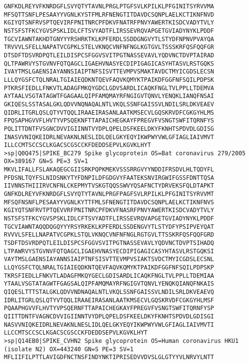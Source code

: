 \begin{lstlisting}
GNFKDLREYVFKNRDGFLSVYQTYTAVNLPRGLPTGFSVLKPILKLPFGINITSYRVVMA
MFSQTTSNFLPESAAYYVGNLKYSTFMLRFNENGTITDAVDCSQNPLAELKCTIKNFNVD
KGIYQTSNFRVSPTQEVIRFPNITNRCPFDKVFNATRFPNVYAWERTKISDCVADYTVLY
NSTSFSTFKCYGVSPSKLIDLCFTSVYADTFLIRSSEVRQVAPGETGVIADYNYKLPDDF
TGCVIAWNTAKHDTGNYYYRSHRKTKLKPFERDLSSDDGNGVYTLSTYDFNPNVPVAYQA
TRVVVLSFELLNAPATVCGPKLSTELVKNQCVNFNFNGLKGTGVLTSSSKRFQSFQQFGR
DTSDFTDSVRDPQTLEILDISPCSFGGVSVITPGTNASSEVAVLYQDVNCTDVPTAIRAD
QLTPAWRVYSTGVNVFQTQAGCLIGAEHVNASYECDIPIGAGICASYHTASVLRSTGQKS
IVAYTMSLGAENSIAYANNSIAIPTNFSISVTTEVMPVSMAKTAVDCTMYICGDSLECSN
LLLQYGSFCTQLNRALTGIAIEQDKNTQEVFAQVKQMYKTPAIKDFGGFNFSQILPDPSK
PTKRSFIEDLLFNKVTLADAGFMKQYGDCLGDVSARDLICAQKFNGLTVLPPLLTDEMVA
AYTAALVSGTATAGWTFGAGAALQIPFAMQMAYRFNGIGVTQNVLYENQKLIANQFNSAI
GKIQESLSSTASALGKLQDVVNQNAQALNTLVKQLSSNFGAISSVLNDILSRLDKVEAEV
QIDRLITGRLQSLQTYVTQQLIRAAEIRASANLAATKMSECVLGQSKRVDFCGKGYHLMS
FPQSAPHGVVFLHVTYVPSQEKNFTTAPAICHEGKAYFPREGVFVSNGTSWFITQRNFYS
PQLITTDNTFVSGNCDVVIGIINNTVYDPLQPELDSFKEELDKYFKNHTSPDVDLGDISG
INASVVNIQKEIDRLNEVAKNLNESLIDLQELGKYEQYIKWPWYVWLGFIAGLIAIVMVT
ILLCCMTSCCSCLKGACSCGSCCKFDEDDSEPVLKGVKLHYT
>sp|Q0Q475|SPIKE_BC279 Spike glycoprotein OS=Bat coronavirus 279/2005 OX=389167 GN=S PE=3 SV=1
MKVLIFALLFSLAKAQEGCGIISRKPQPKMEKVSSSRRGVYYNDDIFRSDVLHLTQDYFL
PFDSNLTQYFSLNIDSNKYTYFDNPILDFGDGVYFAATEKSNVIRGWIFGSSFDNTTQSA
IIVNNSTHIIIRVCNFNLCKEPMYTVSKGTQQSSWVYQSAFNCTYDRVEKSFQLDTAPKT
GNFKDLREYVFKNRDGFLSVYQTYTAVNLPRGFPAGFSVLRPILKLPFGINITSYRVVMT
MFSQFNSNFLPESAAYYVGNLKYTTFMLSFNENGTITDAVDCSQNPLAELKCTIKNFNVS
KGIYQTSNFRVTPTQEVVRFPNITNRCPFDKVFNASRFPNVYAWERTKISDCVADYTVLY
NSTSFSTFKCYGVSPSKLIDLCFTSVYADTFLIRSSEVRQVAPGETGVIADYNYKLPDDF
TGCVIAWNTAQQDQGQYYYRSYRKEKLKPFERDLSSDENGVYTLSTYDFYPSIPVEYQAT
RVVVLSFELLNAPATVCGPKLSTQLVKNQCVNFNFNGLRGTGVLTTSSKRFQSFQQFGRD
TSDFTDSVRDPQTLEILDISPCSFGGVSVITPGTNASSEVAVLYQDVNCTDVPTSIHADQ
LTPAWRVYSTGVNVFQTQAGCLIGAEHVNASYECDIPIGAGICASYHTASVLRSTGQKSI
VAYTMSLGAENSIAYANNSIAIPTNFSISVTTEVMPVSIAKTSVDCTMYICGDSLECSNL
LLQYGSFCTQLNRALTGIAIEQDKNTQEVFAQVKQMYKTPAIKDFGGFNFSQILPDPSKP
TKRSFIEDLLFNKVTLADAGFMKQYGECLGDISARDLICAQKFNGLTVLPPLLTDEMIAA
YTAALVSGTATAGWTFGAGSALQIPFAMQMAYRFNGIGVTQNVLYENQKQIANQFNKAIS
QIQESLTTTSTALGKLQDVVNDNAQALNTLVKQLSSNFGAISSVLNDILSRLDKVEAEVQ
IDRLITGRLQSLQTYVTQQLIRAAEIRASANLAATKMSECVLGQSKRVDFCGKGYHLMSF
PQAAPHGVVFLHVTYVPSQERNFTTAPAICHEGKAYFPREGVFVSNGTSWFITQRNFYSP
QIITTDNTFVAGNCDVVIGIINNTVYDPLQPELDSFKEELDKYFKNHTSPDVDLGDISGI
NASVVNIQKEIDRLNEVAKNLNESLIDLQELGKYEQYIKWPWYVWLGFIAGLIAIVMVTI
LLCCMTSCCSCLKGACSCGSCCKFDEDDSEPVLKGVKLHYT
>sp|Q14EB0|SPIKE_CVHN2 Spike glycoprotein OS=Human coronavirus HKU1 (isolate N2) OX=443240 GN=S PE=3 SV=1
MFLIIFILPTTLAVIGDFNCTNSFINDYNKTIPRISEDVVDVSLGLGTYYVLNRVYLNTT

\end{lstlisting}
